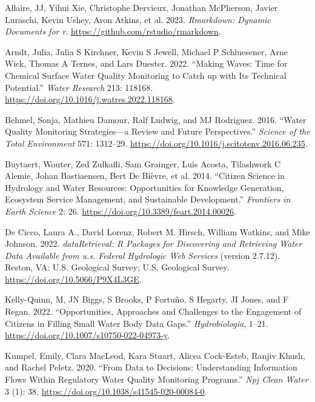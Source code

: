 \hypertarget{refs}{}
\begin{CSLReferences}{1}{0}
\leavevmode{}%
Allaire, JJ, Yihui Xie, Christophe Dervieux, Jonathan McPherson, Javier Luraschi, Kevin Ushey, Aron Atkins, et al. 2023. \emph{Rmarkdown: Dynamic Documents for r}. \url{https://github.com/rstudio/rmarkdown}.

\leavevmode{}%
Arndt, Julia, Julia S Kirchner, Kevin S Jewell, Michael P Schluesener, Arne Wick, Thomas A Ternes, and Lars Duester. 2022. {``Making Waves: Time for Chemical Surface Water Quality Monitoring to Catch up with Its Technical Potential.''} \emph{Water Research} 213: 118168. \url{https://doi.org/10.1016/j.watres.2022.118168}.

\leavevmode{}%
Behmel, Sonja, Mathieu Damour, Ralf Ludwig, and MJ Rodriguez. 2016. {``Water Quality Monitoring Strategies---a Review and Future Perspectives.''} \emph{Science of the Total Environment} 571: 1312--29. \url{https://doi.org/10.1016/j.scitotenv.2016.06.235}.

\leavevmode{}%
Buytaert, Wouter, Zed Zulkafli, Sam Grainger, Luis Acosta, Tilashwork C Alemie, Johan Bastiaensen, Bert De Bièvre, et al. 2014. {``Citizen Science in Hydrology and Water Resources: Opportunities for Knowledge Generation, Ecosystem Service Management, and Sustainable Development.''} \emph{Frontiers in Earth Science} 2: 26. \url{https://doi.org/10.3389/feart.2014.00026}.

\leavevmode{}%
De Cicco, Laura A., David Lorenz, Robert M. Hirsch, William Watkins, and Mike Johnson. 2022. \emph{dataRetrieval: R Packages for Discovering and Retrieving Water Data Available from u.s. Federal Hydrologic Web Services} (version 2.7.12). Reston, VA: U.S. Geological Survey; U.S. Geological Survey. \url{https://doi.org/10.5066/P9X4L3GE}.

\leavevmode{}%
Kelly-Quinn, M, JN Biggs, S Brooks, P Fortuño, S Hegarty, JI Jones, and F Regan. 2022. {``Opportunities, Approaches and Challenges to the Engagement of Citizens in Filling Small Water Body Data Gaps.''} \emph{Hydrobiologia}, 1--21. \url{https://doi.org/10.1007/s10750-022-04973-y}.

\leavevmode{}%
Kumpel, Emily, Clara MacLeod, Kara Stuart, Alicea Cock-Esteb, Ranjiv Khush, and Rachel Peletz. 2020. {``From Data to Decisions: Understanding Information Flows Within Regulatory Water Quality Monitoring Programs.''} \emph{Npj Clean Water} 3 (1): 38. \url{https://doi.org/10.1038/s41545-020-00084-0}.


\end{CSLReferences}
